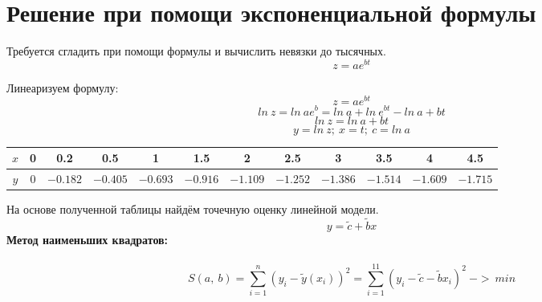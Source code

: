 \documentclass{article}
\begin{document}
\section*{Решение при помощи экспоненциальной формулы}
Требуется сгладить при помощи формулы и вычислить невязки до тысячных.
\[ z = ae^{bt}\]

Линеаризуем формулу:
\[z = ae^{bt}\]
\[ln\ z = ln\ ae^b = ln\ a+ln\ e^{bt} - ln\ a + bt\]
\[ln\ z = ln\ a+bt\]
\[y = ln\ z;\ x=t;\ c = ln\ a\]
\begin{table}[H]
    \centering
    \begin{tabular}{|c|c|c|c|c|c|c|c|c|c|c|c|}
        \hline
        \(x\) & 0 & 0.2 & 0.5 & 1 & 1.5 & 2 & 2.5 & 3 & 3.5 & 4 & 4.5 \\
        \hline
        $y$ & 0& $-0.182$ & $-0.405$ & $-0.693$ & $-0.916$ & $-1.109$ & $-1.252$& $-1.386$& $-1.514$& $-1.609$& $-1.715$ \\
        \hline
    \end{tabular}
\end{table}
На основе полученной таблицы найдём точечную оценку линейной модели.
\[
y = \tilde{c} + \tilde{b} x
\]
\textbf{Метод наименьших квадратов:}
\\ \\
\[S(a,\ b) = \sum_{i=1}^{n}(y_i - \tilde{y}(x_i))^2 = \sum_{i=1}^{11}(y_i - \tilde{c} - \tilde{b}x_i)^2\ ->\ min\]
\end{document}
